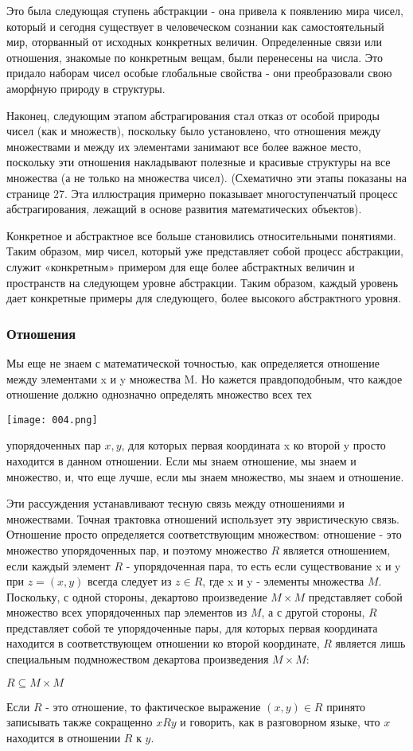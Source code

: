Это была следующая ступень абстракции - она привела к появлению мира чисел, который и сегодня существует в человеческом сознании как самостоятельный мир, оторванный от исходных конкретных величин. Определенные связи или отношения, знакомые по конкретным вещам, были перенесены на числа. Это придало наборам чисел особые глобальные свойства - они преобразовали свою аморфную природу в структуры.

Наконец, следующим этапом абстрагирования стал отказ от особой природы чисел (как и множеств), поскольку было установлено, что отношения между множествами и между их элементами занимают все более важное место, поскольку эти отношения накладывают полезные и красивые структуры на все множества (а не только на множества чисел). (Схематично эти этапы показаны на странице 27. Эта иллюстрация примерно показывает многоступенчатый процесс абстрагирования, лежащий в основе развития математических объектов).

Конкретное и абстрактное все больше становились относительными понятиями. Таким образом, мир чисел, который уже представляет собой процесс абстракции, служит «конкретным» примером для еще более абстрактных величин и пространств на следующем уровне абстракции. Таким образом, каждый уровень дает конкретные примеры для следующего, более высокого абстрактного уровня.

\subsubsection{Отношения}
Мы еще не знаем с математической точностью, как определяется отношение между элементами x и y множества M. Но кажется правдоподобным, что каждое отношение должно однозначно определять множество всех тех
\begin{center}
  \texttt{[image: 004.png]}
\end{center}
\pagebreak
упорядоченных пар \(x,y\), для которых первая координата x ко второй y просто находится в данном отношении. Если мы знаем отношение, мы знаем и множество, и, что еще лучше, если мы знаем множество, мы знаем и отношение.

Эти рассуждения устанавливают тесную связь между отношениями и множествами. Точная трактовка отношений использует эту эвристическую связь. Отношение просто определяется соответствующим множеством: отношение - это множество упорядоченных пар, и поэтому множество \(R\) является отношением, если каждый элемент \(R\) - упорядоченная пара, то есть если существование x и y при \(z =(x,y)\) всегда следует из \(z \in R\), где x и y - элементы множества \(M\).
Поскольку, с одной стороны, декартово произведение \(M \times M\) представляет собой множество всех упорядоченных пар элементов из \(M\), а с другой стороны, \(R\) представляет собой те упорядоченные пары, для которых первая координата находится в соответствующем отношении ко второй координате, \(R\) является лишь специальным подмножеством декартова произведения \(M \times M\):

\vspace{0.5cm}
\(R \subseteq M \times M\)

\vspace{0.5cm}

Если \(R\) - это отношение, то фактическое выражение \((x,y) \in R\) принято записывать также сокращенно \(xRy\) и говорить, как в разговорном языке, что \(x\) находится в отношении \(R\) к \(y\).
